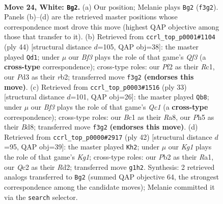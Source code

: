 \documentclass[11pt]{article}
\begin{document}
\clearpage

\begin{figure}[p]\centering
\begin{subfigure}{0.46\textwidth}\centering
\resizebox{\linewidth}{!}{%
\newchessgame
\chessboard[
  setfen={nrbr2k1/p4pb1/7p/2p1p1qP/1p5n/3PPB2/PPQ2P2/RNB1NRK1 w - - 4 24},
  showmover=false,
  pgfstyle=straightmove, color=movearrow, markmove={f3-g2}
]}
\caption{}
\end{subfigure}\hfill
\begin{subfigure}{0.46\textwidth}\centering
\resizebox{\linewidth}{!}{%
\newchessgame
\chessboard[
  setfen={2r3k1/1q2bpp1/b2ppn1p/p7/3PP2B/P3NQ1P/1rB2PP1/2R1R1K1 w - - 0 23},
  showmover=false,
  pgfstyle=straightmove, color=movearrow, markmove={f3-d1}
]}
\caption{}
\end{subfigure}
\\[4pt]
\begin{subfigure}{0.46\textwidth}\centering
\resizebox{\linewidth}{!}{%
\newchessgame
\chessboard[
  setfen={r1qb1rk1/3n1ppp/3Nb3/p2Np1Pn/R3P3/4BP2/1PPQ3P/4KB1R b K - 0 17},
  showmover=false,
  pgfstyle=straightmove, color=movearrow, markmove={c8-b8}
]}
\caption{}
\end{subfigure}\hfill
\begin{subfigure}{0.46\textwidth}\centering
\resizebox{\linewidth}{!}{%
\newchessgame
\chessboard[
  setfen={r3r1k1/p2q1nb1/1p3pp1/2pP1b1p/Pn6/NQN1B1PP/1P1R1PB1/R5K1 w - - 2 22},
  showmover=false,
  pgfstyle=straightmove, color=movearrow, markmove={g1-h2}
]}
\caption{}
\end{subfigure}
\caption{\textbf{Move 24, White: \texttt{Bg2}.} (a) Our position; Melanie plays \texttt{Bg2} (\texttt{f3g2}). Panels (b)--(d) are the retrieved master positions whose correspondence most drove this move (highest QAP objective among those that transfer to it). (b) Retrieved from \texttt{ccrl\_top\_p0001\#1104} (ply 44) [structural distance $d$=105, QAP obj=38]: the master played \texttt{Qd1}; under $\mu$ our \emph{Bf3} plays the role of that game's \emph{Qf3} (a \textbf{cross-type} correspondence); cross-type roles: our \emph{P}f2 as their \emph{R}c1, our \emph{P}d3 as their \emph{r}b2; transferred move \texttt{f3g2} \textbf{(endorses this move)}. (c) Retrieved from \texttt{ccrl\_top\_p0003\#1516} (ply 33) [structural distance $d$=101, QAP obj=26]: the master played \texttt{Qb8}; under $\mu$ our \emph{Bf3} plays the role of that game's \emph{Qc1} (a \textbf{cross-type} correspondence); cross-type roles: our \emph{B}c1 as their \emph{R}a8, our \emph{P}h5 as their \emph{B}d8; transferred move \texttt{f3g2} \textbf{(endorses this move)}. (d) Retrieved from \texttt{ccrl\_top\_p0000\#2917} (ply 42) [structural distance $d$=95, QAP obj=39]: the master played \texttt{Kh2}; under $\mu$ our \emph{Kg1} plays the role of that game's \emph{Kg1}; cross-type roles: our \emph{P}b2 as their \emph{R}a1, our \emph{Q}c2 as their \emph{R}d2; transferred move \texttt{g1h2}. Synthesis: 2 retrieved analogs transferred to \texttt{Bg2} (summed QAP objective 64, the strongest correspondence among the candidate moves); Melanie committed it via the \texttt{search} selector.}
\label{fig:thought-m46}
\end{figure}
\end{document}
